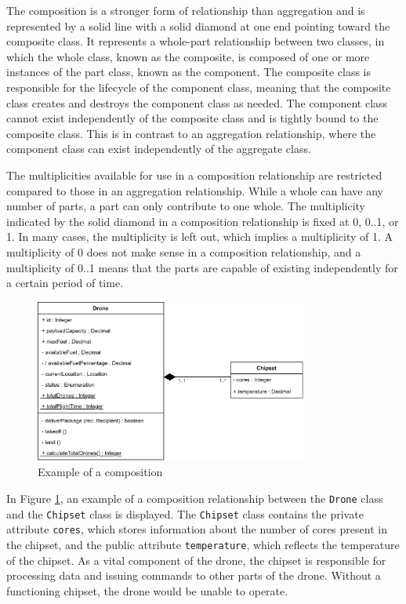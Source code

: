 \documentclass[
	12pt,
    a4paper,
    egregdoesnotlikesansseriftitles, %
    toc=chapterentrywithdots,
    oneside, openany,
    titlepage,
    parskip=half,
    headings=normal,  %
    listof=totoc,
    bibliography=totocnumbered,
    index=totoc,
    captions=tableheading,  %
    listof=flat,
    numbers=noenddot, %
    final]
    {scrbook}
\begin{document}
The composition is a stronger form of relationship than aggregation and is represented by a solid line with a solid diamond at one end pointing toward the composite class. It represents a whole-part relationship between two classes, in which the whole class, known as the composite, is composed of one or more instances of the part class, known as the component. \cite[p. 153-154]{uml}
The composite class is responsible for the lifecycle of the component class, meaning that the composite class creates and destroys the component class as needed. The component class cannot exist independently of the composite class and is tightly bound to the composite class. \cite{uml-diagrams-comp} This is in contrast to an aggregation relationship, where the component class can exist independently of the aggregate class.

The multiplicities available for use in a composition relationship are restricted compared to those in an aggregation relationship. While a whole can have any number of parts, a part can only contribute to one whole. The multiplicity indicated by the solid diamond in a composition relationship is fixed at 0, 0..1, or 1. In many cases, the multiplicity is left out, which implies a multiplicity of 1. A multiplicity of 0 does not make sense in a composition relationship, and a multiplicity of 0..1 means that the parts are capable of existing independently for a certain period of time.
 \cite[p. 153-154]{uml} \cite[p. 68-69]{seidl2015uml}

\begin{figure}[h]
\centering
\includegraphics[width=0.8\textwidth]{figures/aggr_comp/comp.jpg}
\caption[Example composition]{Example of a composition}
\label{fig:composition_example}
\end{figure}


In Figure \ref{fig:composition_example}, an example of a composition relationship between the \texttt{Drone} class and the \texttt{Chipset} class is displayed. The \texttt{Chipset} class contains the private attribute \texttt{cores}, which stores information about the number of cores present in the chipset, and the public attribute \texttt{temperature}, which reflects the temperature of the chipset. As a vital component of the drone, the chipset is responsible for processing data and issuing commands to other parts of the drone. Without a functioning chipset, the drone would be unable to operate.
\end{document}
